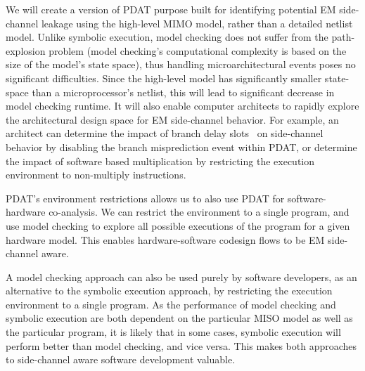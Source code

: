 \color{red}
We will create a version of PDAT purpose built for identifying potential EM
side-channel leakage using the high-level MIMO model, rather than a detailed
netlist model. Unlike symbolic execution, model checking does not suffer from
the path-explosion problem (model checking's computational complexity is based
on the size of the model's state space), thus handling microarchitectural
events poses no significant difficulties. Since the high-level model has
significantly smaller state-space than a microprocessor's netlist, this will
lead to significant decrease in model checking runtime.
It will also enable computer architects to
rapidly explore the architectural design space for EM side-channel behavior.
For example, an architect can determine the impact of branch delay
slots~\cite{lalja88} on side-channel behavior by disabling the branch
misprediction event within PDAT, or determine the impact of software based
multiplication by restricting the execution environment to non-multiply
instructions.

PDAT's environment restrictions allows us to also use PDAT for
software-hardware co-analysis.  We can restrict the environment to a single
program, and use model checking to explore all possible executions of the
program for a given hardware model.  This enables hardware-software codesign
flows to be EM side-channel aware.

A model checking approach can also be used purely by software developers, as an
alternative to the symbolic execution approach, by restricting the execution
environment to a single program.  As the performance of model checking and
symbolic execution are both dependent on the particular MISO model as well as
the particular program, it is likely that in some cases, symbolic execution
will perform better than model checking, and vice versa.  This makes both
approaches to side-channel aware software development valuable.
\color{black}


